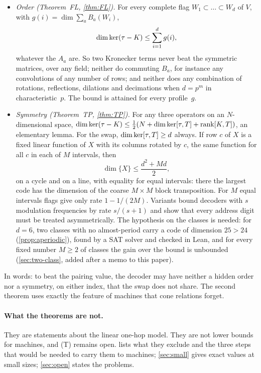 \begin{itemize}[leftmargin=1.5em]
\item \emph{Order (Theorem~FL, \cref{thm:FL}).} For every complete flag $W_1\subset\dots\subset W_d$ of $V$, with
$g(i)=\dim\sum_aB_a(W_i)$,
\[
  \dim\ker(\tau-K)\le\sum_{i=1}^dg(i),
\]
whatever the $A_a$ are. So two Kronecker terms never beat the symmetric matrices, over any field; neither do commuting
$B_a$, for instance any convolutions of any number of rows; and neither does any combination of rotations, reflections,
dilations and decimations when $d=p^m$ in characteristic~$p$. The bound is attained for every profile~$g$.
\item \emph{Symmetry (Theorem~TP, \cref{thm:TP}).} For any three operators on an $N$-dimensional space,
$\dim\ker(\tau-K)\le\frac12(N+\dim\ker[\tau,T]+\operatorname{rank}[K,T])$, an elementary lemma. For the swap, $\dim\ker[\tau,T]\ge d$
always. If row $c$ of $X$ is a fixed linear function of $X$ with its columns rotated by $c$, the same function for all
$c$ in each of $M$ intervals, then
\[
  \dim\{X\}\le\frac{d^2+Md}2 ,
\]
on a cycle and on a line, with equality for equal intervals: there the largest code has the dimension of the coarse
$M\times M$ block transposition. For $M$ equal intervals flags give only rate $1-1/(2M)$. Variants bound decoders with $s$
modulation frequencies by rate $s/(s+1)$ and show that every address digit must be treated asymmetrically. The
hypothesis on the classes is needed: for $d=6$, two classes with no almost-period carry a code of dimension $25>24$
(\cref{prop:aperiodic}), found by a SAT solver and checked in Lean, and for every fixed number $M\ge2$ of classes the gain over
the bound is unbounded (\cref{sec:two-class}, added after a memo to this paper).
\end{itemize}

In words: to beat the pairing value, the decoder may have neither a hidden order nor a symmetry, on either index, that
the swap does not share. The second theorem uses exactly the feature of machines that cone relations forget.

\paragraph{What the theorems are not.} They are statements about the linear one-hop model. They are not lower bounds
for machines, and (T) remains open.  lists what they exclude and the three steps that would be
needed to carry them to machines; \cref{sec:small} gives exact values at small sizes; \cref{sec:open} states the
problems.

